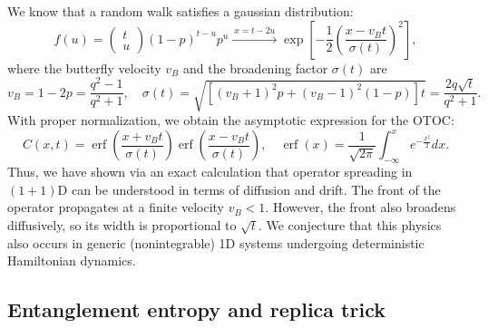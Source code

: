 \documentclass[aps,prb,superscriptaddress,nofootinbib]{revtex4}
\begin{document}
We know that a random walk satisfies a gaussian distribution:
\begin{equation}
	f(u) = \begin{pmatrix} t \\ u \end{pmatrix} (1-p)^{t-u} p^u
	\xrightarrow{\ x=t-2u\ } \exp\left[-\frac{1}{2}\left(\frac{x - v_B t}{\sigma(t)}\right)^2\right],
\end{equation}
where the butterfly velocity $v_B$ and the broadening factor $\sigma(t)$ are
\begin{equation}
	v_B = 1-2p = \frac{q^2-1}{q^2+1},\quad 
	\sigma(t) = \sqrt{\left[(v_B+1)^2 p + (v_B-1)^2(1-p)\right]t} = \frac{2 q \sqrt t}{q^2+1}.
\end{equation}
With proper normalization, we obtain the asymptotic expression for the OTOC:
\begin{equation}
	C(x,t) = \operatorname{erf}\left(\frac{x + v_B t}{\sigma(t)}\right) \operatorname{erf}\left(\frac{x - v_B t}{\sigma(t)}\right), \quad
	\operatorname{erf}(x) = \frac{1}{\sqrt{2\pi}} \int_{-\infty}^x e^{-\frac{x^2}{2}} dx.
\end{equation}
Thus, we have shown via an exact calculation that operator spreading in $(1+1)$D can be understood in terms of diffusion and drift. 
The front of the operator propagates at a finite velocity $v_B < 1$. 
However, the front also broadens diffusively, so its width is proportional to $\sqrt{t}$.
We conjecture that this physics also occurs in generic (nonintegrable) 1D systems undergoing deterministic Hamiltonian dynamics. 


\subsection{Entanglement entropy and replica trick}
\end{document}
